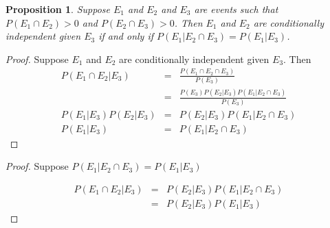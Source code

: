 \documentclass{beamer}
\newtheorem{prop}{Proposition}
\numberwithin{equation}{section}
\begin{document}
\begin{frame}

\begin{prop}
Suppose $E_{1}$ and $E_{2}$ and $E_{3}$ are events such that $P(E_{1} \cap E_{2})>0$ and $P(E_{2} \cap E_{3}) >0$.  Then $E_{1}$ and $E_{2}$ are conditionally independent given $E_{3} $ if and only if $P(E_{1} | E_{2} \cap E_{3})  = P(E_{1} | E_{3}) $.  
\end{prop}

\begin{proof}
Suppose $E_{1}$ and $E_{2}$ are conditionally independent given $E_{3}$.  Then 
\begin{eqnarray}
P(E_{1} \cap E_{2} |  E_{3}) & = & \frac{P(E_{1} \cap E_{2} \cap E_{3}  ) }{P(E_{3} )} \nonumber \\
& = & \frac{P(E_{3})P(E_{2} | E_{3} )P(E_{1} | E_{2} \cap E_{3} ) }{ P(E_{3} )}\nonumber \\
P(E_{1}|E_{3}) P(E_{2} | E_{3} ) & = & P(E_{2} | E_{3} )P(E_{1} | E_{2} \cap E_{3} )\nonumber \\
P(E_{1}|E_{3}) & = & P(E_{1} | E_{2} \cap E_{3} ) \nonumber 
\end{eqnarray}

\end{proof}





\end{frame}

\begin{frame}

\begin{proof}
Suppose $P(E_{1} | E_{2} \cap E_{3})  = P(E_{1} | E_{3}) $

\begin{eqnarray}
P(E_{1} \cap E_{2}| E_{3 } ) & = & P(E_{2} | E_{3} ) P(E_{1} | E_{2}\cap E_{3} ) \nonumber \\
 & = & P(E_{2} | E_{3} ) P(E_{1} | E_{3} ) \nonumber 
\end{eqnarray}

\end{proof}

\end{frame}
\end{document}
